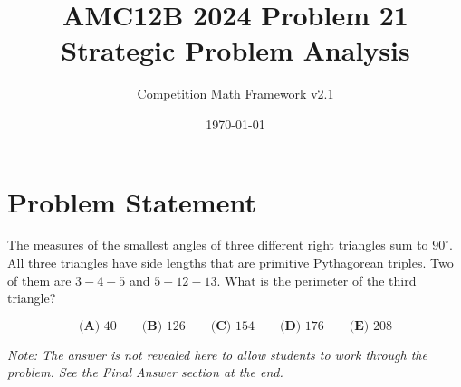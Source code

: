 \documentclass[12pt]{article}
\begin{document}
\title{AMC12B 2024 Problem 21\\Strategic Problem Analysis}
\author{Competition Math Framework v2.1}
\date{\today}
\maketitle

\section*{Problem Statement}

The measures of the smallest angles of three different right triangles sum to $90^{\circ}$. All three triangles have side lengths that are primitive Pythagorean triples. Two of them are $3-4-5$ and $5-12-13$. What is the perimeter of the third triangle?

$$\textbf{(A) } 40 \qquad\textbf{(B) } 126 \qquad\textbf{(C) } 154 \qquad\textbf{(D) } 176 \qquad\textbf{(E) } 208$$

\vspace{0.3cm}
\noindent\textit{Note: The answer is not revealed here to allow students to work through the problem. See the Final Answer section at the end.}
\end{document}
